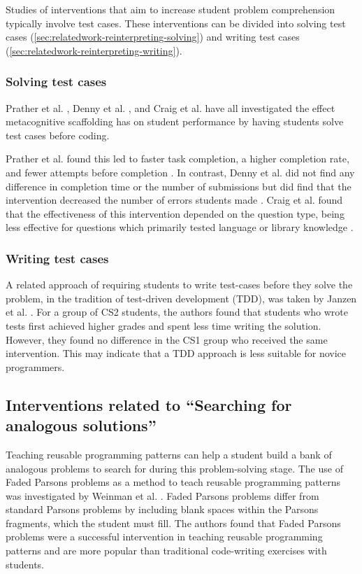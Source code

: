 \documentclass[sigconf,anonymous]{acmart}
\begin{document}
Studies of interventions that aim to increase student problem comprehension typically involve test cases. These interventions can be divided into solving test cases (\autoref{sec:relatedwork-reinterpreting-solving}) and writing test cases (\autoref{sec:relatedwork-reinterpreting-writing}).

\subsubsection{Solving test cases} \label{sec:relatedwork-reinterpreting-solving}
Prather et al. \cite{prather2019}, Denny et al. \cite{denny2019}, and Craig et al. \cite{craig2019} have all investigated the effect metacognitive scaffolding has on student performance by having students solve test cases before coding.

Prather et al. found this led to faster task completion, a higher completion rate, and fewer attempts before completion \cite{prather2019}. In contrast, Denny et al. did not find any difference in completion time or the number of submissions but did find that the intervention decreased the number of errors students made \cite{denny2019}. Craig et al. found that the effectiveness of this intervention depended on the question type, being less effective for questions which primarily tested language or library knowledge \cite{craig2019}.

\subsubsection{Writing test cases} \label{sec:relatedwork-reinterpreting-writing}
A related approach of requiring students to write test-cases before they solve the problem, in the tradition of test-driven development (TDD), was taken by Janzen et al. \cite{janzen2008}. For a group of CS2 students, the authors found that students who wrote tests first achieved higher grades and spent less time writing the solution. However, they found no difference in the CS1 group who received the same intervention. This may indicate that a TDD approach is less suitable for novice programmers.

\subsection{Interventions related to ``Searching for analogous solutions''} \label{sec:relatedwork-searching}
Teaching reusable programming patterns can help a student build a bank of analogous problems to search for during this problem-solving stage. The use of Faded Parsons problems as a method to teach reusable programming patterns was investigated by Weinman et al. \cite{weinman2021}. Faded Parsons problems differ from standard Parsons problems by including blank spaces within the Parsons fragments, which the student must fill. The authors found that Faded Parsons problems were a successful intervention in teaching reusable programming patterns and are more popular than traditional code-writing exercises with students.
\end{document}

